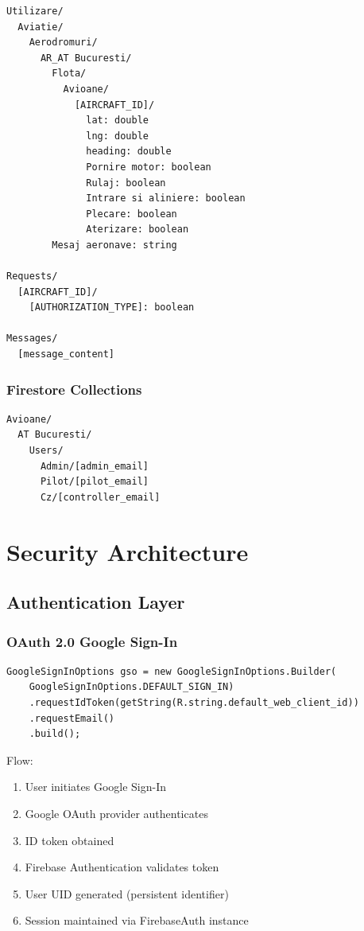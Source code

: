 \documentclass[11pt,a4paper]{report}
\begin{document}
\begin{lstlisting}
Utilizare/
  Aviatie/
    Aerodromuri/
      AR_AT Bucuresti/
        Flota/
          Avioane/
            [AIRCRAFT_ID]/
              lat: double
              lng: double
              heading: double
              Pornire motor: boolean
              Rulaj: boolean
              Intrare si aliniere: boolean
              Plecare: boolean
              Aterizare: boolean
        Mesaj aeronave: string

Requests/
  [AIRCRAFT_ID]/
    [AUTHORIZATION_TYPE]: boolean

Messages/
  [message_content]
\end{lstlisting}

\subsection{Firestore Collections}

\begin{lstlisting}
Avioane/
  AT Bucuresti/
    Users/
      Admin/[admin_email]
      Pilot/[pilot_email]
      Cz/[controller_email]
\end{lstlisting}

\chapter{Security Architecture}

\section{Authentication Layer}

\subsection{OAuth 2.0 Google Sign-In}

\begin{lstlisting}
GoogleSignInOptions gso = new GoogleSignInOptions.Builder(
    GoogleSignInOptions.DEFAULT_SIGN_IN)
    .requestIdToken(getString(R.string.default_web_client_id))
    .requestEmail()
    .build();
\end{lstlisting}

Flow:
\begin{enumerate}
    \item User initiates Google Sign-In
    \item Google OAuth provider authenticates
    \item ID token obtained
    \item Firebase Authentication validates token
    \item User UID generated (persistent identifier)
    \item Session maintained via FirebaseAuth instance
\end{enumerate}
\end{document}
